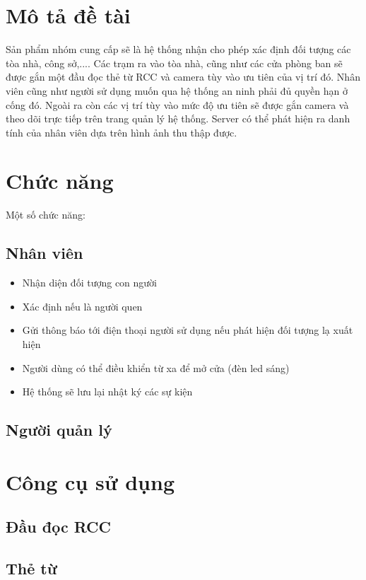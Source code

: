 \documentclass[a4paper]{article}
\begin{document}
\newpage
\tableofcontents
\newpage

\section{Mô tả đề tài}
\hspace{6mm} Sản phẩm nhóm cung cấp sẽ là hệ thống nhận cho phép xác định đối tượng các tòa nhà, công sở,.... Các trạm ra vào tòa nhà, cũng như các cửa phòng ban sẽ được gắn một đầu đọc thẻ từ RCC và camera tùy vào ưu tiên của vị trí đó. Nhân viên cũng như người sử dụng muốn qua hệ thống an ninh phải đủ quyền hạn ở cống đó. Ngoài ra còn các vị trí tùy vào mức độ ưu tiên sẽ được gắn camera và theo dõi trực tiếp trên trang quản lý hệ thống. Server có thể phát hiện ra danh tính của nhân viên dựa trên hình ảnh thu thập được.
\section{Chức năng}
	Một số chức năng:
\subsection{Nhân viên}
	\begin{itemize}
		\item Nhận diện đối tượng con người
		\item Xác định nếu là người quen
		\item Gửi thông báo tới điện thoại người sử dụng nếu phát hiện đối tượng lạ xuất hiện
		\item Người dùng có thể điều khiển từ xa để mở cửa (đèn led sáng)
		\item Hệ thống sẽ lưu lại nhật ký các sự kiện
	\end{itemize}
\subsection{Người quản lý}


\section{Công cụ sử dụng}
\subsection{Đầu đọc RCC}
\subsection{Thẻ từ}
\end{document}
